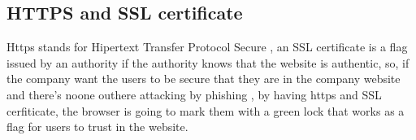 \documentclass[10pt,a4paper]{article} %
\begin{document}
             \subsection{HTTPS and SSL certificate}
                 Https stands for Hipertext Transfer Protocol Secure , an SSL
                 certificate is a flag issued by an authority if the authority
                 knows that the website is authentic, so, if
                 the company want the users to be secure that they are in the
                 company website and there's noone outhere attacking by
                 phishing , by having https and SSL cerfiticate, the browser is
                 going to mark them with a green lock that works as a flag for
                 users to trust in the website.
                 
        

        
        

    
    \nocite{*}
    
    
\end{document}
